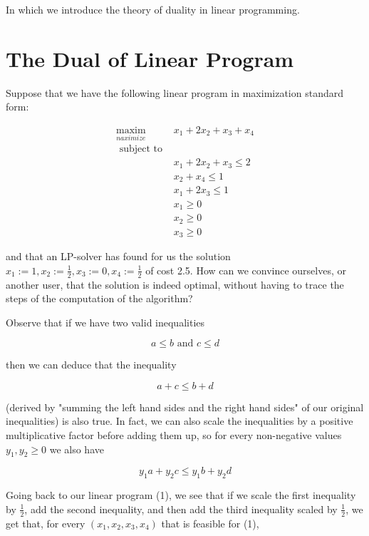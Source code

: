 \documentclass[letter,12pt]{book}
\renewcommand{\0}{\mathbf{0}}
\begin{document}




In which we introduce the theory of duality in linear programming.

\section{The Dual of Linear Program}

Suppose that we have the following linear program in maximization standard form:

$$
\begin{array}{ll}
\underset{n a x i m i z e}{\operatorname{maxim}} & x_{1}+2 x_{2}+x_{3}+x_{4} \\
\text { subject to } & \\
& x_{1}+2 x_{2}+x_{3} \leq 2 \\
& x_{2}+x_{4} \leq 1 \\
& x_{1}+2 x_{3} \leq 1 \\
& x_{1} \geq 0 \\
& x_{2} \geq 0 \\
& x_{3} \geq 0
\end{array}
$$

and that an LP-solver has found for us the solution $x_{1}:=1, x_{2}:=\frac{1}{2}, x_{3}:=0, x_{4}:=\frac{1}{2}$ of cost 2.5. How can we convince ourselves, or another user, that the solution is indeed optimal, without having to trace the steps of the computation of the algorithm?

Observe that if we have two valid inequalities

$$
a \leq b \text { and } c \leq d
$$

then we can deduce that the inequality

$$
a+c \leq b+d
$$

(derived by "summing the left hand sides and the right hand sides" of our original inequalities) is also true. In fact, we can also scale the inequalities by a positive multiplicative factor before adding them up, so for every non-negative values $y_{1}, y_{2} \geq 0$ we also have 

$$
y_{1} a+y_{2} c \leq y_{1} b+y_{2} d
$$

Going back to our linear program (1), we see that if we scale the first inequality by $\frac{1}{2}$, add the second inequality, and then add the third inequality scaled by $\frac{1}{2}$, we get that, for every $\left(x_{1}, x_{2}, x_{3}, x_{4}\right)$ that is feasible for (1),
\end{document}
